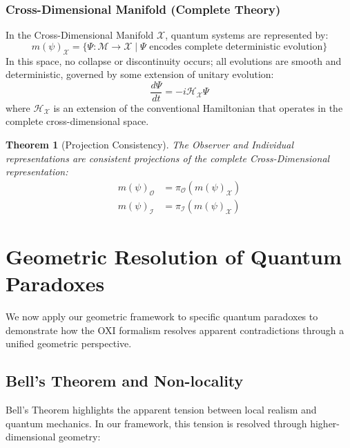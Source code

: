 \documentclass{article}
\newtheorem{theorem}{Theorem}
\begin{document}
\subsubsection{Cross-Dimensional Manifold (Complete Theory)}

In the Cross-Dimensional Manifold $\mathcal{X}$, quantum systems are represented by:
\begin{equation}
m(\psi)_{\mathcal{X}} = \{\Psi: \mathcal{M} \rightarrow \mathcal{X} \mid \Psi \text{ encodes complete deterministic evolution}\}
\end{equation}
In this space, no collapse or discontinuity occurs; all evolutions are smooth and deterministic, governed by some extension of unitary evolution:
\begin{equation}
\frac{d\Psi}{dt} = -i\mathcal{H}_{\mathcal{X}}\Psi
\end{equation}
where $\mathcal{H}_{\mathcal{X}}$ is an extension of the conventional Hamiltonian that operates in the complete cross-dimensional space.

\begin{theorem}[Projection Consistency]
The Observer and Individual representations are consistent projections of the complete Cross-Dimensional representation:
\begin{align}
m(\psi)_{\mathcal{O}} &= \pi_{\mathcal{O}}(m(\psi)_{\mathcal{X}}) \\
m(\psi)_{\mathcal{I}} &= \pi_{\mathcal{I}}(m(\psi)_{\mathcal{X}})
\end{align}
\end{theorem}

\section{Geometric Resolution of Quantum Paradoxes}

We now apply our geometric framework to specific quantum paradoxes to demonstrate how the OXI formalism resolves apparent contradictions through a unified geometric perspective.

\subsection{Bell's Theorem and Non-locality}

Bell's Theorem highlights the apparent tension between local realism and quantum mechanics. In our framework, this tension is resolved through higher-dimensional geometry:
\end{document}
